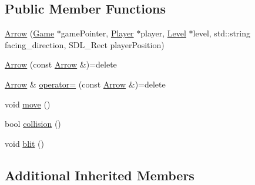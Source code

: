 \subsection*{Public Member Functions}
\begin{DoxyCompactItemize}
\item 
\hyperlink{classArrow_ae134c1249c785d8921886c355bac8972}{Arrow} (\hyperlink{classGame}{Game} $\ast$game\-Pointer, \hyperlink{classPlayer}{Player} $\ast$player, \hyperlink{classLevel}{Level} $\ast$level, std\-::string facing\-\_\-direction, S\-D\-L\-\_\-\-Rect player\-Position)
\item 
\hyperlink{classArrow_a3eacdef1aee0243a65d738f9723916f8}{Arrow} (const \hyperlink{classArrow}{Arrow} \&)=delete
\item 
\hyperlink{classArrow}{Arrow} \& \hyperlink{classArrow_a764fe70858bda2a51d61316bac67397d}{operator=} (const \hyperlink{classArrow}{Arrow} \&)=delete
\item 
void \hyperlink{classArrow_aab8bcf5d8e523c6d992c96af645dd30a}{move} ()
\item 
bool \hyperlink{classArrow_aab2752bc7867eb7595a959189e0eb667}{collision} ()
\item 
void \hyperlink{classArrow_afdc36c090185454d3630a4248e3f9e62}{blit} ()
\end{DoxyCompactItemize}
\subsection*{Additional Inherited Members}


